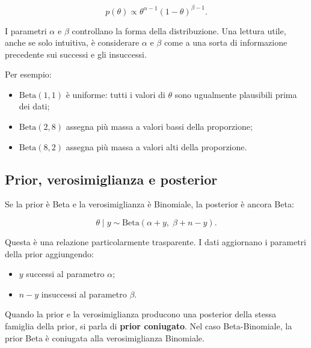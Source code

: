 \documentclass[
  italian,
  letterpaper,
  a4paper,
  11pt,
  open=any]{scrbook}
\providecommand{\tightlist}{%
  \setlength{\itemsep}{0pt}\setlength{\parskip}{0pt}}
\theoremstyle{plain}
\theoremstyle{definition}
\theoremstyle{definition}
\theoremstyle{remark}
\begin{document}
\[
p(\theta) \propto \theta^{\alpha - 1}(1-\theta)^{\beta - 1}.
\]

I parametri \(\alpha\) e \(\beta\) controllano la forma della
distribuzione. Una lettura utile, anche se solo intuitiva, è considerare
\(\alpha\) e \(\beta\) come a una sorta di informazione precedente sui
successi e gli insuccessi.

Per esempio:

\begin{itemize}
\tightlist
\item
  \(\text{Beta}(1,1)\) è uniforme: tutti i valori di \(\theta\) sono
  ugualmente plausibili prima dei dati;
\item
  \(\text{Beta}(2,8)\) assegna più massa a valori bassi della
  proporzione;
\item
  \(\text{Beta}(8,2)\) assegna più massa a valori alti della
  proporzione.
\end{itemize}

\subsection{Prior, verosimiglianza e
posterior}\label{prior-verosimiglianza-e-posterior}

Se la prior è Beta e la verosimiglianza è Binomiale, la posterior è
ancora Beta:

\[
\theta \mid y \sim \text{Beta}(\alpha + y,\; \beta + n - y).
\]

Questa è una relazione particolarmente trasparente. I dati aggiornano i
parametri della prior aggiungendo:

\begin{itemize}
\tightlist
\item
  \(y\) successi al parametro \(\alpha\);
\item
  \(n-y\) insuccessi al parametro \(\beta\).
\end{itemize}

\begin{tcolorbox}[enhanced jigsaw, arc=.35mm, bottomrule=.15mm, bottomtitle=1mm, breakable, colback=white, colbacktitle=quarto-callout-note-color!10!white, colframe=quarto-callout-note-color-frame, coltitle=black, left=2mm, leftrule=.75mm, opacityback=0, opacitybacktitle=0.6, rightrule=.15mm, title=\textcolor{quarto-callout-note-color}{\faInfo}\hspace{0.5em}{Coniugazione}, titlerule=0mm, toprule=.15mm, toptitle=1mm]

Quando la prior e la verosimiglianza producono una posterior della
stessa famiglia della prior, si parla di \textbf{prior coniugato}. Nel
caso Beta-Binomiale, la prior Beta è coniugata alla verosimiglianza
Binomiale.

\end{tcolorbox}
\end{document}
